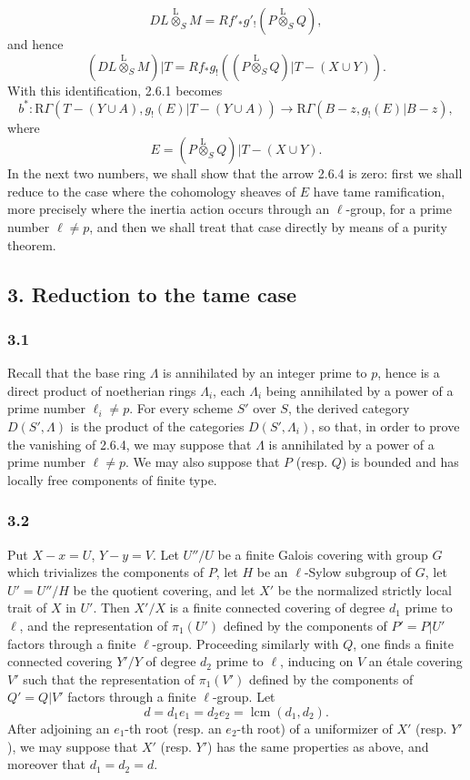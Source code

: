 \documentclass[11pt]{article}
\providecommand{\lten}{\overset{\mathrm L}{\otimes}}
\providecommand{\lten}{\overset{\mathrm L}{\otimes}}
\providecommand{\lten}{\overset{\mathrm L}{\otimes}}
\providecommand{\lten}{\overset{\mathrm L}{\otimes}}
\providecommand{\lten}{\overset{\mathrm L}{\otimes}}
\providecommand{\lten}{\overset{\mathrm L}{\otimes}}
\providecommand{\lten}{\overset{\mathrm L}{\otimes}}
\begin{document}
\[
DL\lten_SM=Rf'_*g'_!(P\lten_SQ),
\]
and hence
\begin{equation}
(DL\lten_SM)|T=Rf_*g_!((P\lten_SQ)|T-(X\cup Y)).
\tag{2.6.3}
\end{equation}
With this identification, 2.6.1 becomes
\begin{equation}
b^*:\mathrm R\Gamma(T-(Y\cup A),g_!(E)|T-(Y\cup A))
 \longrightarrow \mathrm R\Gamma(B-z,g_!(E)|B-z),
\tag{2.6.4}
\end{equation}
where
\[
E=(P\lten_SQ)|T-(X\cup Y).
\]
In the next two numbers, we shall show that the arrow 2.6.4 is zero: first we shall reduce to the case where the cohomology sheaves of $E$ have tame ramification, more precisely where the inertia action occurs through an $\ell$-group, for a prime number $\ell\ne p$, and then we shall treat that case directly by means of a purity theorem.

\subsection*{3. Reduction to the tame case}

\subsubsection*{3.1}
Recall that the base ring $\Lambda$ is annihilated by an integer prime to $p$, hence is a direct product of noetherian rings $\Lambda_i$, each $\Lambda_i$ being annihilated by a power of a prime number $\ell_i\ne p$. For every scheme $S'$ over $S$, the derived category $D(S',\Lambda)$ is the product of the categories $D(S',\Lambda_i)$, so that, in order to prove the vanishing of 2.6.4, we may suppose that $\Lambda$ is annihilated by a power of a prime number $\ell\ne p$. We may also suppose that $P$ (resp. $Q$) is bounded and has locally free components of finite type.

\subsubsection*{3.2}
Put $X-x=U$, $Y-y=V$. Let $U''/U$ be a finite Galois covering with group $G$ which trivializes the components of $P$, let $H$ be an $\ell$-Sylow subgroup of $G$, let $U'=U''/H$ be the quotient covering, and let $X'$ be the normalized strictly local trait of $X$ in $U'$. Then $X'/X$ is a finite connected covering of degree $d_1$ prime to $\ell$, and the representation of $\pi_1(U')$ defined by the components of $P'=P|U'$ factors through a finite $\ell$-group. Proceeding similarly with $Q$, one finds a finite connected covering $Y'/Y$ of degree $d_2$ prime to $\ell$, inducing on $V$ an étale covering $V'$ such that the representation of $\pi_1(V')$ defined by the components of $Q'=Q|V'$ factors through a finite $\ell$-group. Let
\[
d=d_1e_1=d_2e_2=\operatorname{lcm}(d_1,d_2).
\]
After adjoining an $e_1$-th root (resp. an $e_2$-th root) of a uniformizer of $X'$ (resp. $Y'$), we may suppose that $X'$ (resp. $Y'$) has the same properties as above, and moreover that $d_1=d_2=d$.
\end{document}
